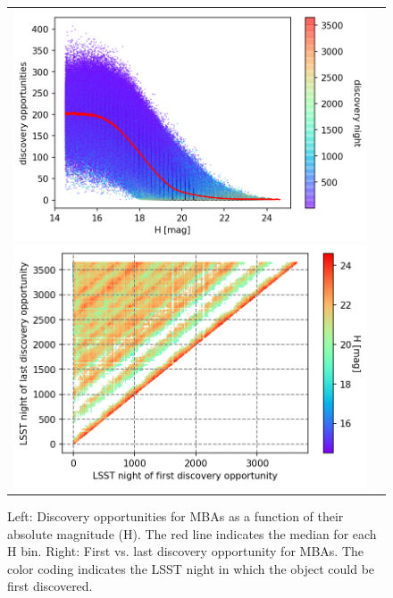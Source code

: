\begin{figure}[tb!]
\begin{tabular}{ll}
\includegraphics[width=0.5\linewidth]{figs/disc_opport3.png}
\includegraphics[width=0.5\linewidth]{figs/first_vs_last.png} &
\end{tabular}
\caption{Left: Discovery opportunities for MBAs as a function of their absolute magnitude (H). The red line indicates the median for each H bin. Right: First vs. last discovery opportunity for MBAs. The color coding indicates the \gls{LSST} night in which the object could be first discovered.}
\label{fig:do}       %
\end{figure}
\clearpage
